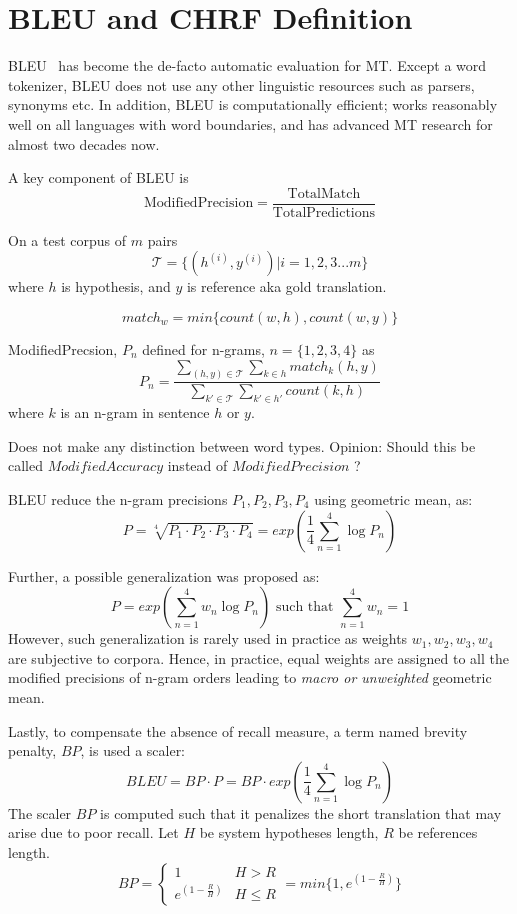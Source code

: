 

\section{BLEU and CHRF Definition}
\label{sec:bleu-def}

BLEU~\cite{papineni-etal-2002-bleu} has become the de-facto automatic evaluation for MT.
Except a word tokenizer, BLEU does not use any other linguistic resources such as parsers, synonyms etc. 
In addition, BLEU is computationally efficient; works reasonably well on all languages with word boundaries, and has advanced MT research for almost two decades now.


A key component of BLEU is $$\text{ModifiedPrecision} = \frac{\text{TotalMatch}}{\text{TotalPredictions}}$$

On a test corpus of $m$ pairs $$ \mathcal{T} = \{ (h^{(i)}, y^{(i)}) | i = 1,2,3...m \} $$ where $h$ is hypothesis, and $y$ is reference aka gold translation.

$$match_w = min \{ count(w, h), count(w, y) \}$$ 

 ModifiedPrecsion, $P_n$ defined for n-grams, $n=\{1, 2, 3, 4\}$ as
 $$ P_n = \frac{\sum_{(h, y) \in \mathcal{T}}  \sum_{k \in h} match_{k} (h, y) }{ \sum_{k' \in \mathcal{T}}  \sum_{k' \in h'} count(k, h) }$$  
 where $k$ is an n-gram in sentence $h$ or $y$.

Does not make any distinction between word types. 
Opinion: Should this be called $ModifiedAccuracy$ instead of $ModifiedPrecision$ ?

BLEU reduce the n-gram precisions $P_1, P_2, P_3, P_4$ using geometric mean, as:
$$P = \sqrt[4]{P_1 \cdot P_2 \cdot P_3 \cdot P_4} = exp(\frac{1}{4}\sum_{n=1}^4  \log P_n )$$

Further, a possible generalization was proposed as:  $$P= exp(\sum_{n=1}^4 w_n \log P_n ) \text{ such that } \sum_{n=1}^4 w_n = 1$$
However, such generalization is rarely used in practice as weights $w_1, w_2, w_3, w_4$ are subjective to corpora. 
Hence, in practice, equal weights  are assigned to all the modified precisions of n-gram orders leading to \textit{macro or unweighted} geometric mean.

Lastly, to compensate the absence of recall measure, a term named brevity penalty, $BP$, is used a scaler: 
$$ BLEU = BP \cdot P = BP \cdot exp(\frac{1}{4}\sum_{n=1}^4  \log P_n ) $$
The scaler $BP$ is computed such that it penalizes the short translation that may arise due to poor recall.
Let $H$ be system hypotheses length, $R$ be references length. 
$$ BP = \begin{cases} 
  1                    & H > R \\
 e^{(1 - \frac{R}{H})} & H \le R 
 \end{cases}  = min \{1,  e^{(1 - \frac{R}{H})}\} $$

